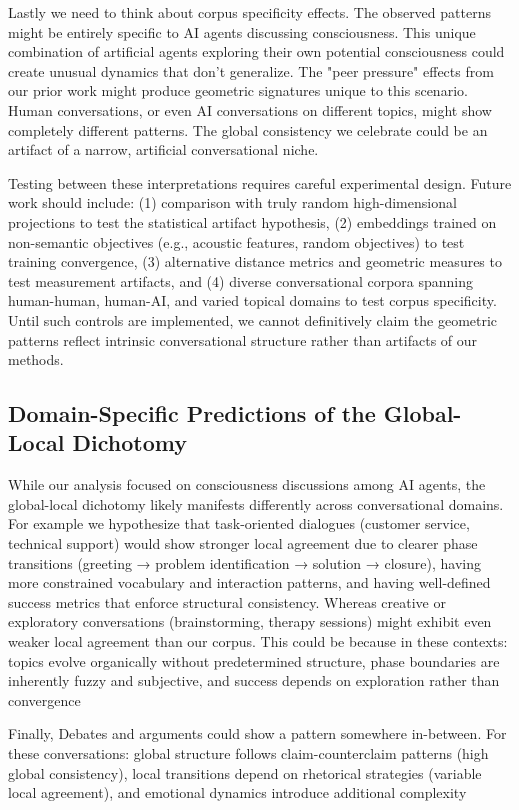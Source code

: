 \documentclass[11pt,letterpaper]{article}
\begin{document}
Lastly we need to think about corpus specificity effects. The observed patterns might be entirely specific to AI agents discussing consciousness. This unique combination of artificial agents exploring their own potential consciousness could create unusual dynamics that don't generalize. The "peer pressure" effects from our prior work might produce geometric signatures unique to this scenario. Human conversations, or even AI conversations on different topics, might show completely different patterns. The global consistency we celebrate could be an artifact of a narrow, artificial conversational niche.

Testing between these interpretations requires careful experimental design. Future work should include: (1) comparison with truly random high-dimensional projections to test the statistical artifact hypothesis, (2) embeddings trained on non-semantic objectives (e.g., acoustic features, random objectives) to test training convergence, (3) alternative distance metrics and geometric measures to test measurement artifacts, and (4) diverse conversational corpora spanning human-human, human-AI, and varied topical domains to test corpus specificity. Until such controls are implemented, we cannot definitively claim the geometric patterns reflect intrinsic conversational structure rather than artifacts of our methods.

\subsection{Domain-Specific Predictions of the Global-Local Dichotomy}

While our analysis focused on consciousness discussions among AI agents, the global-local dichotomy likely manifests differently across conversational domains. For example we hypothesize that task-oriented dialogues (customer service, technical support) would show stronger local agreement due to clearer phase transitions (greeting → problem identification → solution → closure), having more constrained vocabulary and interaction patterns, and having well-defined success metrics that enforce structural consistency. 
Whereas creative or exploratory conversations (brainstorming, therapy sessions) might exhibit even weaker local agreement than our corpus. This could be because in these contexts: topics evolve organically without predetermined structure, phase boundaries are inherently fuzzy and subjective, and success depends on exploration rather than convergence

Finally, Debates and arguments could show a pattern somewhere in-between. For these conversations: global structure follows claim-counterclaim patterns (high global consistency), local transitions depend on rhetorical strategies (variable local agreement), and emotional dynamics introduce additional complexity
\end{document}

